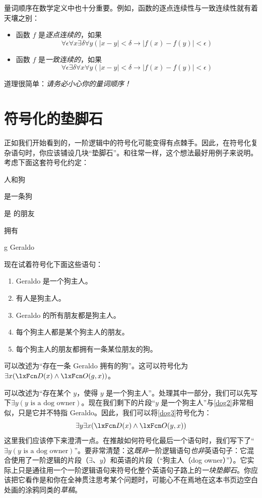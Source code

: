 量词顺序在数学定义中也十分重要。例如，函数的逐点连续性与一致连续性就有着天壤之别：

\begin{itemize}
\item 函数 $f$ 是\emph{逐点连续的}，如果
\[
\forall \epsilon\forall x\exists \delta\forall y(\left|x - y\right| < \delta \to \left|f(x) - f(y)\right| < \epsilon)
\]
\item 函数 $f$ 是\emph{一致连续的}，如果
\[
\forall \epsilon\exists \delta\forall x\forall y(\left|x - y\right| < \delta \to \left|f(x) - f(y)\right| < \epsilon)
\]
\end{itemize}

道理很简单：\emph{请务必小心你的量词顺序！}

\section{符号化的垫脚石}
正如我们开始看到的，一阶逻辑中的符号化可能变得有点棘手。因此，在符号化复杂语句时，你应该铺设几块“垫脚石”。和往常一样，这个想法最好用例子来说明。考虑下面这套符号化约定：

\begin{ekey}
\item[\text{论域}] 人和狗
\item[\atom{D}{x}]  是一条狗
\item[\atom{F}{x,y}]  是  的朋友
\item[\atom{O}{x,y}]  拥有 
\item[g] Geraldo
\end{ekey}

现在试着符号化下面这些语句：

\begin{enumerate}
\item\label{dog2} Geraldo 是一个狗主人。
\item\label{dog3} 有人是狗主人。
\item\label{dog4} Geraldo 的所有朋友都是狗主人。
\item\label{dog5} 每个狗主人都是某个狗主人的朋友。
\item\label{dog6} 每个狗主人的朋友都拥有一条某位朋友的狗。
\end{enumerate}

可以改述为“存在一条 Geraldo 拥有的狗”。这可以符号化为$\exists x(\atom{D}{x} \eand \atom{O}{g,x})$。

可以改述为“存在某个 $y$，使得 $y$ 是一个狗主人”。处理其中一部分，我们可以先写下$\exists y(y\text{ is a dog owner})$。现在我们剩下的片段“$y$ 是一个狗主人”与\cref*{dog2}非常相似，只是它并不特指 Geraldo。因此，我们可以将\cref*{dog3}符号化为：
$$\exists y \exists x(\atom{D}{x} \eand \atom{O}{y,x})$$
这里我们应该停下来澄清一点。在推敲如何符号化最后一个语句时，我们写下了“$\exists y(y\text{ is a
dog owner})$”。要非常清楚：这\emph{既非}一阶逻辑语句\emph{也非}英语句子：它混合使用了一阶逻辑的片段（$\exists$、$y$）和英语的片段（“狗主人（dog owner）”）。它实际上只是通往用一个一阶逻辑语句来符号化整个英语句子路上的\emph{一块垫脚石}。你应该把它看作是和你在全神贯注思考某个问题时，可能心不在焉地在这本书页边空白处画的涂鸦同类的\emph{草稿}。

